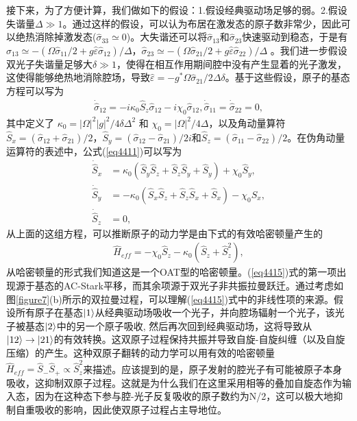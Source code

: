 接下来，为了方便计算，我们做如下的假设：1.假设经典驱动场足够的弱。2.假设失谐量$\Delta\gg 1$。通过这样的假设，可以认为布居在激发态的原子数非常少，因此可以绝热消除掉激发态(${\hat{\sigma} _{33}} \simeq 0$)。大失谐还可以将$\hat{\sigma}_{13}$和$\hat{\sigma}_{23}$快速驱动到稳态，于是有${\hat \sigma _{13}} \simeq  - \left( {\Omega {{\hat \sigma }_{11}}/2 + g\hat \varepsilon {{\hat \sigma }_{12}}} \right)/\Delta $，${\hat \sigma _{23}} \simeq  - \left( {\Omega {{\hat \sigma }_{21}}/2 + g\hat \varepsilon {{\hat \sigma }_{22}}} \right)/\Delta $ 。我们进一步假设双光子失谐量足够大$\delta\gg 1$，使得在相互作用期间腔中没有产生显着的光子激发，这使得能够绝热地消除腔场，导致$\hat \varepsilon  =  - {g^*}\Omega {\hat \sigma _{21}}/2\Delta \delta $。基于这些假设，原子的基态方程可以写为
\begin{align}
{\dot{ \hat{ \sigma }}_{12}} =  - i{\kappa _0}{\hat S_z}{\hat \sigma _{12}} - i{\chi _0}{\hat \sigma _{12}},{\dot{ \hat{ \sigma }} _{11}} = {\dot{ \hat{ \sigma }} _{22}} = 0,\label{eq4411}
\end{align}
其中定义了 $\kappa_0=|\Omega|^2{|g|^2}/4{\delta\Delta^2}$ 和 $\chi_0 ={|\Omega|^2}/{4\Delta}$，以及角动量算符${\hat S_x} = (\hat{\sigma}_{12}+\hat{\sigma}_{21})/2$，${\hat S_y} = (\hat{\sigma}_{12}-\hat{\sigma}_{21})/2i$和${\hat S_z} = (\hat{\sigma}_{11}-\hat{\sigma}_{22})/2$。在伪角动量运算符的表述中，公式(\ref{eq4411})可以写为
\begin{align}
{{\dot {\hat S}}_x} &= {\kappa _0}\left( {{{\hat S}_y}{{\hat S}_z} + {{\hat S}_z}{{\hat S}_y}} +{{\hat S}_y}\right) + {\chi _0}{{\hat S}_y},\label{eq4412}\\
{{\dot {\hat S}}_y} &=  - {\kappa _0}\left( {{{\hat S}_x}{{\hat S}_z} + {{\hat S}_z}{{\hat S}_x}} +{{\hat S}_x}\right) - {\chi _0}{{\hat S}_x},\label{eq4413}\\
{{\dot {\hat S}}_z} &= 0,\label{eq4414}
\end{align}
从上面的这组方程，可以推断原子的动力学是由下式的有效哈密顿量产生的
\begin{align}
\hat H_{eff}=-\chi_0\hat S_z-\kappa_0(\hat S_z+\hat S_z^2),\label{eq4415}
\end{align}
从哈密顿量的形式我们知道这是一个OAT型的哈密顿量\cite{PRA1993Kitagawa}。(\ref{eq4415})式的第一项出现源于基态的AC-Stark平移，而其余项源于双光子非共振拉曼跃迁。通过考虑如图\ref{figure7}(b)所示的双拉曼过程，可以理解(\ref{eq4415})式中的非线性项的来源。假设所有原子在基态$\ket{1}$从经典驱动场吸收一个光子，并向腔场辐射一个光子，该光子被基态$\ket{2}$中的另一个原子吸收, 然后再次回到经典驱动场，这将导致从$\ket{12}\to\ket{21}$的有效转换。这双原子过程保持共振并导致自旋-自旋纠缠（以及自旋压缩）的产生。这种双原子翻转的动力学可以用有效的哈密顿量${\hat H_{eff}} = {\hat S_ - }{\hat S_ + } \propto \hat S_z^2$来描述。应该提到的是，原子发射的腔光子有可能被原子本身吸收，这抑制双原子过程。这就是为什么我们在这里采用相等的叠加自旋态作为输入态，因为在这种态下参与腔-光子反复吸收的原子数约为N/2，这可以极大地抑制自重吸收的影响，因此使双原子过程占主导地位。

